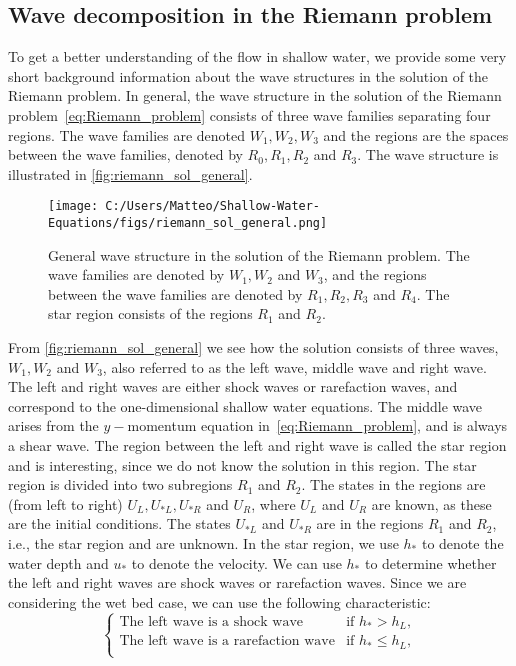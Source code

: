 \subsection{Wave decomposition in the Riemann problem}
To get a better understanding of the flow in shallow water, we provide some very short background information about the wave structures in the solution of the Riemann problem.
In general, the wave structure in the solution of the Riemann problem~\eqref{eq:Riemann_problem} consists of three wave families separating four regions.
The wave families are denoted $W_1, W_2, W_3$ and the regions are the spaces between the wave families, denoted by $R_0, R_1, R_2$ and $R_3$.
The wave structure is illustrated in \autoref{fig:riemann_sol_general}.
\begin{figure}[H]
    \centering
    \texttt{[image: C:/Users/Matteo/Shallow-Water-Equations/figs/riemann\_sol\_general.png]}
    \caption{General wave structure in the solution of the Riemann problem.
            The wave families are denoted by $W_1, W_2$ and $W_3$, and the regions between the wave families are denoted by $R_1, R_2, R_3$ and $R_4$. 
            The star region consists of the regions $R_1$ and $R_2$.}\label{fig:riemann_sol_general}
\end{figure}
From \autoref{fig:riemann_sol_general} we see how the solution consists of three waves, $W_1, W_2$ and $W_3$, also referred to as the left wave, middle wave and right wave.
The left and right waves are either shock waves or rarefaction waves, and correspond to the one-dimensional shallow water equations.
The middle wave arises from the $y-$momentum equation in~\eqref{eq:Riemann_problem}, and is always a shear wave.
The region between the left and right wave is called the star region and is interesting, since we do not know the solution in this region.
The star region is divided into two subregions $R_1$ and $R_2$.
The states in the regions are (from left to right) $U_L, U_{*L}, U_{*R}$ and $U_R$, where $U_L$ and $U_R$ are known, as these are the initial conditions.
The states $U_{*L}$ and $U_{*R}$ are in the regions $R_1$ and $R_2$, i.e., the star region and are unknown.
In the star region, we use $h_*$ to denote the water depth and $u_*$ to denote the velocity.
We can use $h_*$ to determine whether the left and right waves are shock waves or rarefaction waves.
Since we are considering the wet bed case, we can use the following characteristic:
\begin{equation*}
    \begin{cases}
        \text{The left wave is a shock wave} & \text{if } h_* > h_L, \\
        \text{The left wave is a rarefaction wave} & \text{if } h_* \leq h_L, \\        
    \end{cases} 
\end{equation*}
